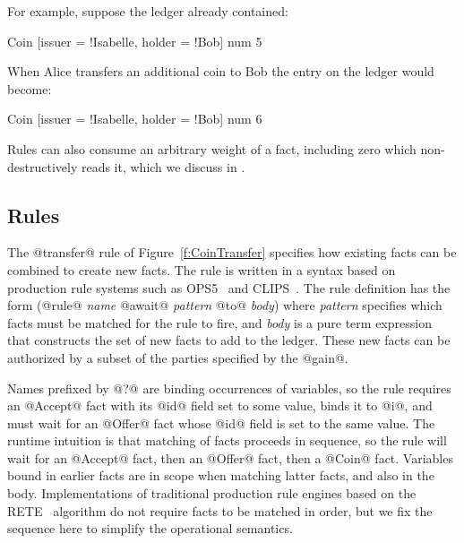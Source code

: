 For example, suppose the ledger already contained:
\begin{small}
\begin{code}
 Coin [issuer = !Isabelle, holder = !Bob]  num 5
\end{code}
\end{small}
%
When Alice transfers an additional coin to Bob the entry on the ledger would become:
\begin{small}
\begin{code}
 Coin [issuer = !Isabelle, holder = !Bob]  num 6
\end{code}
\end{small}
%
Rules can also consume an arbitrary weight of a fact, including zero which non-destructively reads it, which we discuss in \REF.



\subsection{Rules}
The @transfer@ rule of Figure~\ref{f:CoinTransfer} specifies how existing facts can be combined to create new facts. The rule is written in a syntax based on production rule systems such as OPS5~\cite{Forgy1981:OPS5} and CLIPS~\cite{Riley2017:CLIPS}. The rule definition has the form (@rule@ \emph{name} @await@ \emph{pattern} @to@ \emph{body}) where \emph{pattern} specifies which facts must be matched for the rule to fire, and \emph{body} is a pure term expression that constructs the set of new facts to add to the ledger. These new facts can be authorized by a subset of the parties specified by the @gain@.

Names prefixed by @?@ are binding occurrences of variables, so the rule requires an @Accept@ fact with its @id@ field set to some value, binds it to @i@, and must wait for an @Offer@ fact whose @id@ field is set to the same value. The runtime intuition is that matching of facts proceeds in sequence, so the rule will wait for an @Accept@ fact, then an @Offer@ fact, then a @Coin@ fact. Variables bound in earlier facts are in scope when matching latter facts, and also in the body. Implementations of traditional production rule engines based on the RETE~\cite{Forgy1981:RETE} algorithm do not require facts to be matched in order, but we fix the sequence here to simplify the operational semantics.

